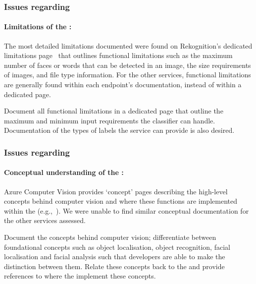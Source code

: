 \subsubsection[Dimension B Issues]{Issues regarding \dimb{}}

\paragraph{Limitations of the  :} The most detailed limitations documented were found on Rekognition's dedicated limitations page~ that outlines functional limitations such as the maximum number of faces or words that can be detected in an image, the size requirements of images, and file type information. For the other services, functional limitations are generally found within each endpoint's  documentation, instead of within a dedicated page.

\begin{leftbar}\SuggestedImprovement
Document all functional limitations in a dedicated page that outline the maximum and minimum input requirements the classifier can handle. Documentation of the types of labels the service can provide is also desired.  
\end{leftbar}


\subsubsection[Dimension C Issues]{Issues regarding \dimc{}}

\paragraph{Conceptual understanding of the  :} Azure Computer Vision provides `concept' pages describing the high-level concepts behind computer vision and where these functions are implemented within the  (e.g.,~). We were unable to find similar conceptual documentation for the other services assessed.

\begin{leftbar}\SuggestedImprovement
Document the concepts behind computer vision; differentiate between foundational concepts such as object localisation, object recognition, facial localisation and facial analysis such that developers are able to make the distinction between them. Relate these concepts back to the  and provide references to where the  implement these concepts.
\end{leftbar}

